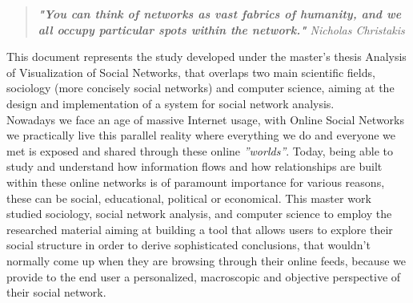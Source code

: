
\begin{quote}
\textit{\textbf{"You can think of networks as vast fabrics of humanity, and we all occupy particular spots within the network."} Nicholas Christakis}
\end{quote}

This document represents the study developed under the master's thesis Analysis of Visualization of Social Networks, that overlaps
two main scientific fields, sociology (more concisely social networks) and computer science, aiming at the design and implementation of a system for social network analysis.\\

Nowadays we face an age of massive Internet usage, with Online Social Networks we practically live this parallel reality where everything we do and everyone we met is exposed and shared through these online \textit{''worlds''}. Today, being able to study and understand how information flows and how relationships are built within these online networks is of paramount importance for various reasons, these can be social, educational, political or economical. This master work studied sociology, social network analysis, and computer science to employ the researched material aiming at building a tool that allows users to explore their social structure in order to derive sophisticated conclusions, that wouldn't normally come up when they are browsing through their online feeds, because we provide to the end user a personalized, macroscopic and objective perspective of their social network.